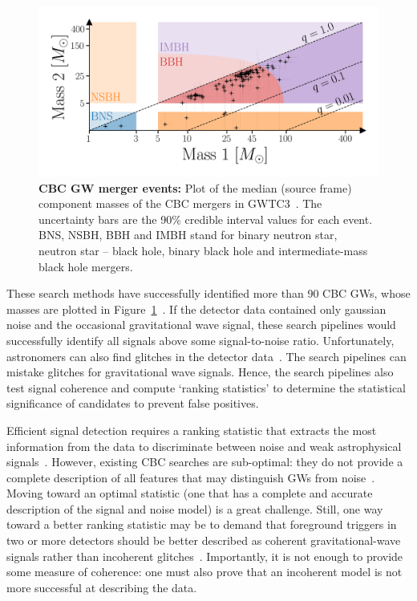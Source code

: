 \begin{figure}
\begin{center}
  \centerline{\includegraphics[width=1.1\linewidth]{src/figures/gw_catalog.png}}
  \caption{\textbf{CBC GW merger events:} Plot of the median (source frame) component masses of the CBC mergers in GWTC3~\cite{gwtc3}. The uncertainty bars are the 90\% credible interval values for each event. BNS, NSBH, BBH and IMBH stand for binary neutron star, neutron star -- black hole, binary black hole and intermediate-mass black hole mergers. }
  \label{fig:cbc_mergers}
\end{center}
\end{figure}

These search methods have successfully identified more than 90 CBC GWs, whose masses are plotted in Figure~\ref{fig:cbc_mergers}~\cite{gwtc3}.
If the detector data contained only gaussian noise and the occasional gravitational wave signal, these search pipelines would successfully identify all signals above some signal-to-noise ratio. 
Unfortunately, astronomers can also find glitches in the detector data~\cite{gw_search_review}. 
The search pipelines can mistake glitches for gravitational wave signals. 
Hence, the search pipelines also test signal coherence and compute `ranking statistics' to determine the statistical significance of candidates to prevent false positives. 

Efficient signal detection requires a ranking statistic that extracts the most information from the data to discriminate between noise and weak astrophysical signals~\cite{bci, bayeswave_as_followup, bcr_paper, bootstrap_gw, bcr_gw151216,bcr_gw151216, bayesian_odds}.  
However, existing CBC searches are sub-optimal: they do not provide a complete description of all features that may distinguish GWs from noise~\cite{bci}. 
Moving toward an optimal statistic (one that has a complete and accurate description of the signal and noise model) is a great challenge. 
Still, one way toward a better ranking statistic may be to demand that foreground triggers in two or more detectors should be better described as coherent gravitational-wave signals rather than incoherent glitches~\cite{bci}.
Importantly, it is not enough to provide some measure of coherence: one must also prove that an incoherent model is not more successful at describing the data. 

